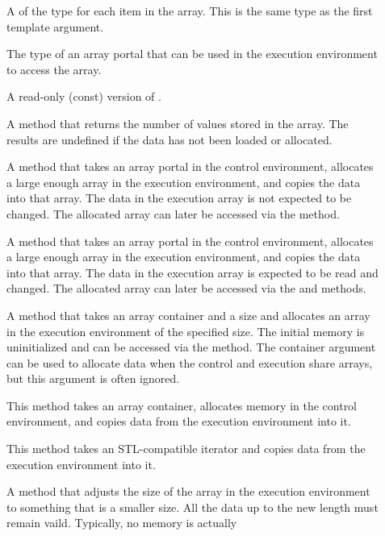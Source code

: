 \begin{description}
\item[] A  of the type for each item
  in the array. This is the same type as the first template argument.
\item[] The type of an array portal that can be used
  in the execution environment to access the array.
\item[] A read-only (const) version of
  .
\item[] A method that returns the number of
  values stored in the array. The results are undefined if the data has not
  been loaded or allocated.
\item[] A method that takes an array portal in
  the control environment, allocates a large enough array in the execution
  environment, and copies the data into that array. The data in the
  execution array is not expected to be changed. The allocated array can
  later be accessed via the  method.
\item[] A method that takes an array portal in
  the control environment, allocates a large enough array in the execution
  environment, and copies the data into that array. The data in the
  execution array is expected to be read and changed. The allocated array
  can later be accessed via the  and
   methods.
\item[] A method that takes an array
  container and a size and allocates an array in the execution environment
  of the specified size. The initial memory is uninitialized and can be
  accessed via the  method. The container argument can
  be used to allocate data when the control and execution share arrays, but
  this argument is often ignored.
\item[] This method takes an array container,
  allocates memory in the control environment, and copies data from the
  execution environment into it.
\item[] This method takes an STL-compatible iterator and
  copies data from the execution environment into it.
\item[] A method that adjusts the size of the array in the
  execution environment to something that is a smaller size. All the data
  up to the new length must remain vaild. Typically, no memory is actually

\end{description}
